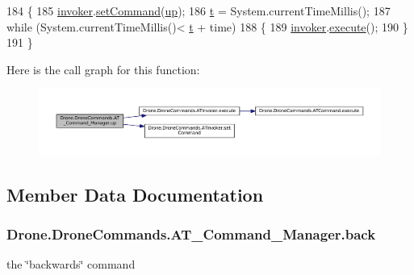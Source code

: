 \begin{DoxyCode}
184     \{
185         \hyperlink{class_drone_1_1_drone_commands_1_1_a_t___command___manager_a642a1ab26cb9c2df925c2a62d9c15d44}{invoker}.\hyperlink{class_drone_1_1_drone_commands_1_1_a_t_invoker_af32f17db8eb3a66a6f3d05ec7e00ef0b}{setCommand}(\hyperlink{class_drone_1_1_drone_commands_1_1_a_t___command___manager_a2a050072c86dfbd84ee82696b59d366e}{up});
186         \hyperlink{class_drone_1_1_drone_commands_1_1_a_t___command___manager_ae17b2729d7c785eebb2af3ada7069efe}{t} = System.currentTimeMillis();
187         \textcolor{keywordflow}{while} (System.currentTimeMillis()< \hyperlink{class_drone_1_1_drone_commands_1_1_a_t___command___manager_ae17b2729d7c785eebb2af3ada7069efe}{t} + time)
188         \{
189             \hyperlink{class_drone_1_1_drone_commands_1_1_a_t___command___manager_a642a1ab26cb9c2df925c2a62d9c15d44}{invoker}.\hyperlink{class_drone_1_1_drone_commands_1_1_a_t_invoker_a0dfcc8b67f8642820b66411954452d06}{execute}();
190         \}
191     \}
\end{DoxyCode}


Here is the call graph for this function\+:\nopagebreak
\begin{figure}[H]
\begin{center}
\leavevmode
\includegraphics[width=350pt]{class_drone_1_1_drone_commands_1_1_a_t___command___manager_a4c5e3deb10626fd443c37b83b944bea4_cgraph}
\end{center}
\end{figure}




\subsection{Member Data Documentation}
\hypertarget{class_drone_1_1_drone_commands_1_1_a_t___command___manager_a6a61163ab15381d542794a87a7045be8}{}
\subsubsection[{back}]{ Drone.\+Drone\+Commands.\+A\+T\+\_\+\+Command\+\_\+\+Manager.\+back\hspace{0.3cm}{\ttfamily [private]}}\label{class_drone_1_1_drone_commands_1_1_a_t___command___manager_a6a61163ab15381d542794a87a7045be8}
the \char`\"{}backwards\char`\"{} command 

